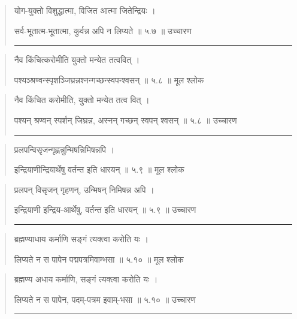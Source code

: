 \begin{quotation}

योग-युक्तो विशुद्धात्मा, विजित आत्मा जितेन्द्रियः  ।  

सर्व-भूतात्म-भूतात्मा, कुर्वन्न अपि न लिप्यते  ॥ ५.७ ॥  उच्चारण

\noindent\rule{16cm}{0.4pt} 
\end{quotation}


\begin{quotation}  

नैव किंचित्करोमीति युक्तो मन्येत तत्ववित्‌  ।  

पश्यञ्श्रण्वन्स्पृशञ्जिघ्रन्नश्नन्गच्छन्स्वपन्श्वसन्‌  ॥ ५.८ ॥  मूल श्लोक
\end{quotation}

\begin{quotation}

नैव किंचित करोमीति, युक्तो मन्येत तत्व वित्‌  ।  

पश्यन् श्रण्वन् स्पर्शन् जिघ्रन्न, अस्नन् गच्छन् स्वपन् श्वसन्‌  ॥ ५.८ ॥  उच्चारण

\noindent\rule{16cm}{0.4pt} 
\end{quotation}


\begin{quotation}  

प्रलपन्विसृजन्गृह्णन्नुन्मिषन्निमिषन्नपि  । 

इन्द्रियाणीन्द्रियार्थेषु वर्तन्त इति धारयन्‌  ॥ ५.९ ॥  मूल श्लोक
\end{quotation}

\begin{quotation}

प्रलपन् विसृजन् गृहणन्, उन्मिषन् निमिषन्न अपि  । 

इन्द्रियाणी इन्द्रिय-आर्थेषु, वर्तन्त इति धारयन्‌  ॥ ५.९ ॥  उच्चारण

\noindent\rule{16cm}{0.4pt} 
\end{quotation}


\begin{quotation}  

ब्रह्मण्याधाय कर्माणि सङ्‍गं त्यक्त्वा करोति यः  ।  

लिप्यते न स पापेन पद्मपत्रमिवाम्भसा  ॥ ५.१० ॥  मूल श्लोक
\end{quotation}

\begin{quotation}

ब्रह्मण्य अधाय कर्माणि, सङ्‍गं त्यक्त्वा करोति यः  ।  

लिप्यते न स पापेन, पदम्-पत्रम इवाम्-भसा  ॥ ५.१० ॥  उच्चारण

\noindent\rule{16cm}{0.4pt} 
\end{quotation}


